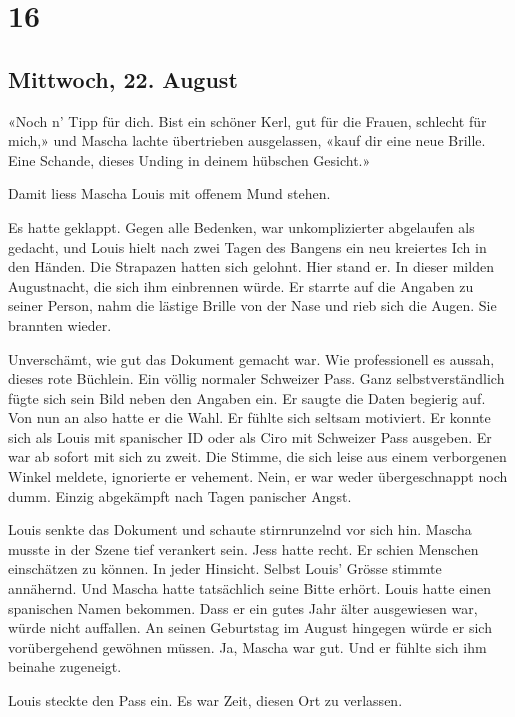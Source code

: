 \chapter{16}

\section{Mittwoch, 22.  August}



«Noch n’ Tipp für dich. Bist ein schöner Kerl, gut für die Frauen,
schlecht für mich,» und Mascha lachte übertrieben ausgelassen, «kauf dir
eine neue Brille. Eine Schande, dieses Unding in deinem hübschen
Gesicht.»

Damit liess Mascha Louis mit offenem Mund stehen. 

\sectionbreak

Es hatte geklappt. Gegen alle Bedenken, war unkomplizierter abgelaufen
als gedacht, und Louis hielt nach zwei Tagen des Bangens ein neu
kreiertes Ich in den Händen. Die Strapazen hatten sich gelohnt. Hier
stand er. In dieser milden Augustnacht, die sich ihm einbrennen würde.
Er starrte auf die Angaben zu seiner Person, nahm die lästige Brille von
der Nase und rieb sich die Augen. Sie brannten wieder. 

Unverschämt, wie gut das Dokument gemacht war. Wie professionell es
aussah, dieses rote Büchlein. Ein völlig normaler Schweizer Pass. Ganz
selbstverständlich fügte sich sein Bild neben den Angaben ein. Er saugte
die Daten begierig auf. Von nun an also hatte er die Wahl. Er
fühlte sich seltsam motiviert. Er konnte sich als Louis mit spanischer ID  
oder als Ciro mit Schweizer Pass ausgeben. Er war ab sofort mit sich zu
zweit. Die Stimme, die sich leise aus einem verborgenen Winkel meldete,
ignorierte er vehement. Nein, er war weder übergeschnappt noch dumm.
Einzig abgekämpft nach Tagen panischer Angst.

Louis senkte das Dokument und schaute stirnrunzelnd vor sich hin. Mascha
musste in der Szene tief verankert sein. Jess hatte recht. Er schien
Menschen einschätzen zu können. In jeder Hinsicht. Selbst Louis’ Grösse
stimmte annähernd. Und Mascha hatte tatsächlich seine Bitte erhört. Louis 
hatte einen spanischen Namen bekommen. Dass er ein gutes Jahr älter
ausgewiesen war, würde nicht auffallen. An seinen Geburtstag im August
hingegen würde er sich vorübergehend gewöhnen müssen. Ja, Mascha war gut. Und er
fühlte sich ihm beinahe zugeneigt.

Louis steckte den Pass ein. Es war Zeit, diesen Ort zu verlassen.

